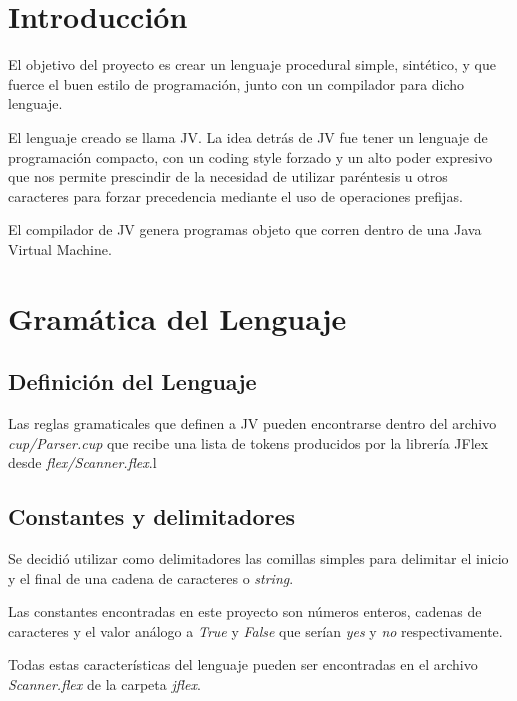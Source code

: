 \documentclass{article}
\begin{document}

\clearpage
\tableofcontents

\clearpage

\section{Introducción}
\par El objetivo del proyecto es crear un lenguaje procedural simple, sintético, y que fuerce el buen estilo de programación, junto con un compilador para dicho lenguaje.\\
\par El lenguaje creado se llama JV. La idea detrás de JV fue tener un lenguaje de programación compacto, con un coding style forzado y un alto poder expresivo que nos permite prescindir de la necesidad de utilizar paréntesis u otros caracteres para forzar precedencia mediante el uso de operaciones prefijas.
\par El compilador de JV genera  programas objeto que corren dentro de una Java Virtual Machine.
\clearpage


\section{Gramática del Lenguaje}

\subsection{Definición del Lenguaje}
\par Las reglas gramaticales que definen a JV pueden encontrarse dentro del archivo \textit{cup/Parser.cup} que recibe una lista de tokens producidos por la librería JFlex desde \textit{flex/Scanner.flex}.l
\subsection{Constantes y delimitadores}
\par Se decidió utilizar como delimitadores las comillas simples para delimitar el inicio y el final de una cadena de caracteres o \textit{string}.
\par Las constantes encontradas en este proyecto son números enteros, cadenas de caracteres y el valor análogo a \textit{True} y \textit{False} que serían \textit{yes} y \textit{no} respectivamente.
\par Todas estas características del lenguaje pueden ser encontradas en el archivo \textit{Scanner.flex} de la carpeta \textit{jflex}. 
\end{document}
